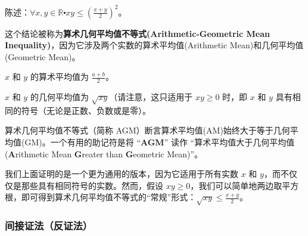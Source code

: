 \begin{example}[算术几何平均值不等式的一个实例]

    \begin{center}
        陈述：$\forall x, y \in \mathbb{R} \centerdot xy \le (\frac{x+y}{2})^2$。
    \end{center}
    \begin{center}
        \noindent {}
    \end{center}
    这个结论被称为\textbf{算术几何平均值不等式(Arithmetic-Geometric Mean Inequality)}，因为它涉及两个实数的算术平均值(Arithmetic Mean)和几何平均值(Geometric Mean)。

    $x$ 和 $y$ 的算术平均值为 $\frac{a+b}{2}$。

    $x$ 和 $y$ 的几何平均值为 $\sqrt{xy}$（请注意，这只适用于 $xy \ge 0$ 时，即 $x$ 和 $y$ 具有相同的符号（无论是正数、负数或是零）。

    算术几何平均值不等式（简称 AGM）断言算术平均值(AM)始终大于等于几何平均值(GM)。一个有用的助记符是将 ``\textbf{AGM}'' 读作 ``算术平均值大于几何平均值(\textbf{A}rithmetic Mean \textbf{G}reater than \textbf{G}eometric Mean)''。

    我们上面证明的是一个更为通用的版本，因为它适用于所有实数 $x$ 和 $y$，而不仅仅是那些具有相同符号的实数。然而，假设 $xy \ge 0$，我们可以简单地两边取平方根，即可得到算术几何平均值不等式的``常规''形式：$\sqrt{xy} \le \frac{x+y}{2}$。
\end{example}

\subsubsection*{间接证法（反证法）}

